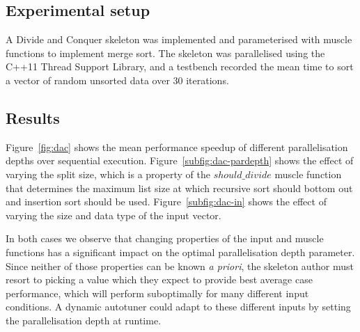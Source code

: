 \subsection{Experimental setup}
A Divide and Conquer skeleton was implemented and parameterised with
muscle functions to implement merge sort. The skeleton was
parallelised using the C++11 Thread Support Library, and a testbench
recorded the mean time to sort a vector of random unsorted data over
30 iterations.

\subsection{Results}
Figure~\ref{fig:dac} shows the mean performance speedup of different
parallelisation depths over sequential
execution. Figure~\ref{subfig:dac-pardepth} shows the effect of
varying the split size, which is a property of the $should\_divide$
muscle function that determines the maximum list size at which
recursive sort should bottom out and insertion sort should be
used. Figure~\ref{subfig:dac-in} shows the effect of varying the size
and data type of the input vector.

In both cases we observe that changing properties of the input and
muscle functions has a significant impact on the optimal
parallelisation depth parameter. Since neither of those properties can
be known \emph{a priori}, the skeleton author must resort to picking a
value which they expect to provide best average case performance,
which will perform suboptimally for many different input conditions. A
dynamic autotuner could adapt to these different inputs by setting the
parallelisation depth at runtime.
